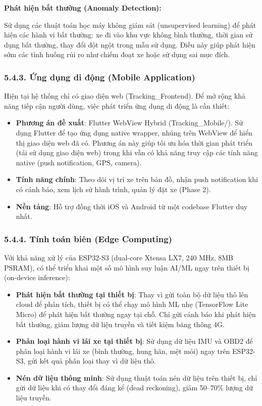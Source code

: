\documentclass[13pt,a4paper]{extarticle}
\renewcommand{\\}{\thesislongtableorignewline\hline}%
\providecommand{\tightlist}{%
  \setlength{\itemsep}{0pt}\setlength{\parskip}{0pt}}
\begin{document}
\textbf{Phát hiện bất thường (Anomaly Detection):}

Sử dụng các thuật toán học máy không giám sát (unsupervised learning) để
phát hiện các hành vi bất thường: xe đi vào khu vực không bình thường,
thời gian sử dụng bất thường, thay đổi đột ngột trong mẫu sử dụng. Điều
này giúp phát hiện sớm các tình huống rủi ro như chiếm đoạt xe hoặc sử
dụng sai mục đích.

\subsubsection{5.4.3. Ứng dụng di động (Mobile
Application)}\label{543-ux1ee9ng-dux1ee5ng-di-ux111ux1ed9ng-mobile-application}

Hiện tại hệ thống chỉ có giao diện web (Tracking\_Frontend). Để mở rộng
khả năng tiếp cận người dùng, việc phát triển ứng dụng di động là cần
thiết:

\begin{itemize}
\tightlist
\item
  \textbf{Phương án đề xuất}: Flutter WebView Hybrid
  (Tracking\_Mobile/). Sử dụng Flutter để tạo ứng dụng native wrapper,
  nhúng trên WebView để hiển thị giao diện web đã có. Phương án này giúp
  tối ưu hóa thời gian phát triển (tái sử dụng giao diện web) trong khi
  vẫn có khả năng truy cập các tính năng native (push notification, GPS,
  camera).
\item
  \textbf{Tính năng chính}: Theo dõi vị trí xe trên bản đồ, nhận push
  notification khi có cảnh báo, xem lịch sử hành trình, quản lý đặt xe
  (Phase 2).
\item
  \textbf{Nền tảng}: Hỗ trợ đồng thời iOS và Android từ một codebase
  Flutter duy nhất.
\end{itemize}

\subsubsection{5.4.4. Tính toán biên (Edge
Computing)}\label{544-tuxednh-touxe1n-biuxean-edge-computing}

Với khả năng xử lý của ESP32-S3 (dual-core Xtensa LX7, 240 MHz, 8MB
PSRAM), có thể triển khai một số mô hình suy luận AI/ML ngay trên thiết
bị (on-device inference):

\begin{itemize}
\tightlist
\item
  \textbf{Phát hiện bất thường tại thiết bị}: Thay vì gửi toàn bộ dữ
  liệu thô lên cloud để phân tích, thiết bị có thể chạy mô hình ML nhẹ
  (TensorFlow Lite Micro) để phát hiện bất thường ngay tại chỗ. Chỉ gửi
  cảnh báo khi phát hiện bất thường, giảm lượng dữ liệu truyền và tiết
  kiệm băng thông 4G.
\item
  \textbf{Phân loại hành vi lái xe tại thiết bị}: Sử dụng dữ liệu IMU và
  OBD2 để phân loại hành vi lái xe (bình thường, hung hãn, mệt mỏi) ngay
  trên ESP32-S3, gửi kết quả phân loại thay vì dữ liệu thô.
\item
  \textbf{Nén dữ liệu thông minh}: Sử dụng thuật toán nén dữ liệu trên
  thiết bị, chỉ gửi dữ liệu khi có thay đổi đáng kể (dead reckoning),
  giảm 50--70\% lượng dữ liệu truyền.
\end{itemize}
\end{document}
